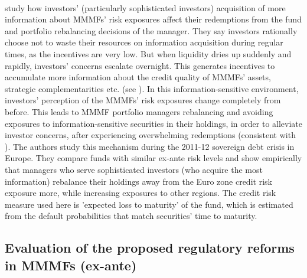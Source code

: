 \documentclass[11pt]{article}
\begin{document}
\paragraph{} \cite{gallagher2020investor} study how investors' (particularly sophisticated investors) acquisition of more information about MMMFs' risk exposures affect their redemptions from the fund and portfolio rebalancing decisions of the manager.
They say investors rationally choose not to waste their resources on information acquisition during regular times, as the incentives are very low. But when liquidity dries up suddenly and rapidly, investors' concerns escalate overnight. This generates incentives to accumulate more information about the credit quality of MMMFs' assets, strategic complementarities etc. (see \cite{schmidt2016runs}). In this information-sensitive environment, investors' perception of the MMMFs' risk exposures change completely from before. This leads to MMMF portfolio managers rebalancing and avoiding exposures to information-sensitive securities in their holdings, in order to alleviate investor concerns, after experiencing overwhelming redemptions (consistent with \cite{strahan2015once}). The authors study this mechanism during the 2011-12 sovereign debt crisis in Europe. They compare funds with similar ex-ante risk levels and show empirically that managers who serve sophisticated investors (who acquire the most information) rebalance their holdings away from the Euro zone credit risk exposure more, while increasing exposures to other regions. The credit risk measure used here is 'expected loss to maturity' of the fund, which is estimated from the default probabilities that match securities' time to maturity.


\subsection{Evaluation of the proposed regulatory reforms in MMMFs (ex-ante)}
\end{document}
